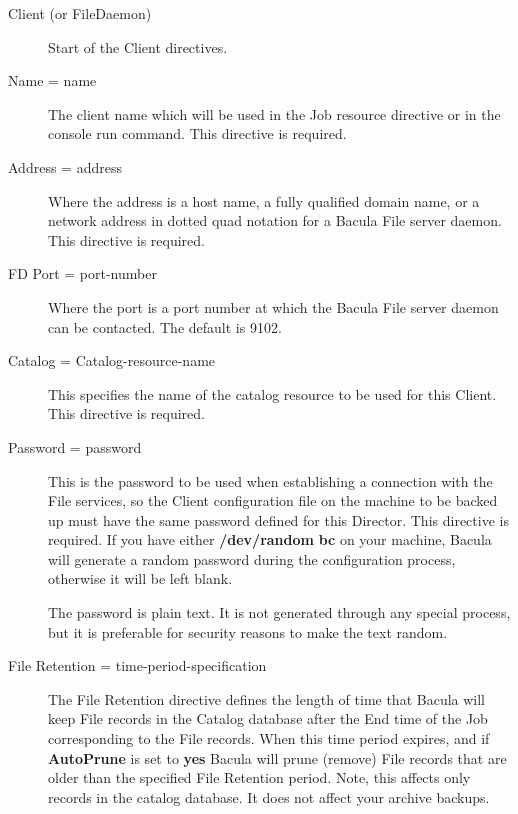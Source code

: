 \begin{description}

\item [Client (or FileDaemon)]
   Start of the Client directives.  

\item [Name = \lt{}name\gt{}]
   The client name which will be used in the  Job resource directive or in the
console run command.  This directive is required.  

\item [Address = \lt{}address\gt{}]
   Where the address is a host name, a fully qualified domain name, or a
   network address in dotted quad notation for a Bacula File server daemon.
   This directive is required.

\item [FD Port = \lt{}port-number\gt{}]
   Where the port is a port  number at which the Bacula File server daemon can
   be contacted.  The default is 9102. 

\item [Catalog = \lt{}Catalog-resource-name\gt{}]
   This specifies the  name of the catalog resource to be used for this Client. 
   This directive is required.  

\item [Password = \lt{}password\gt{}]
   This is the password to be  used when establishing a connection with the File
   services, so  the Client configuration file on the machine to be backed up
   must  have the same password defined for this Director. This directive is 
   required.  If you have either {\bf /dev/random}  {\bf bc} on your machine,
   Bacula will generate a random  password during the configuration process,
   otherwise it will  be left blank. 

   The password is plain text.  It is not generated through any special
   process, but it is preferable for security reasons to make the text
   random.

\label{FileRetention}
\item [File Retention = \lt{}time-period-specification\gt{}]
   The File Retention directive defines the length of time that  Bacula will
   keep File records in the Catalog database after the End time of the
   Job corresponding to the File records.
   When this time period expires, and if
   {\bf AutoPrune} is set to  {\bf yes} Bacula will prune (remove) File records
   that  are older than the specified File Retention period. Note, this  affects
   only records in the catalog database. It does not  affect your archive
   backups.  


\end{description}
